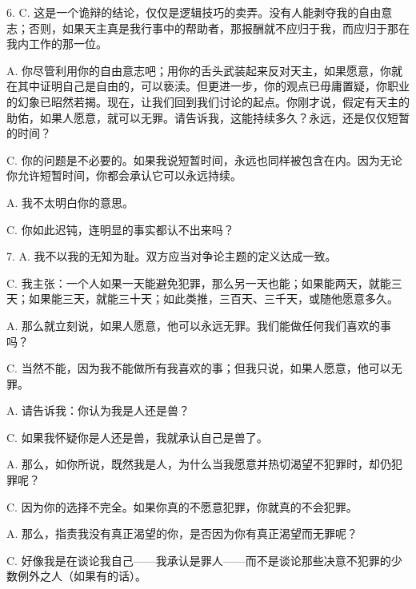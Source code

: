 6. C. 这是一个诡辩的结论，仅仅是逻辑技巧的卖弄。没有人能剥夺我的自由意志；否则，如果天主真是我行事中的帮助者，那报酬就不应归于我，而应归于那在我内工作的那一位。\par

A. 你尽管利用你的自由意志吧；用你的舌头武装起来反对天主，如果愿意，你就在其中证明自己是自由的，可以亵渎。但更进一步，你的观点已毋庸置疑，你职业的幻象已昭然若揭。现在，让我们回到我们讨论的起点。你刚才说，假定有天主的助佑，如果人愿意，就可以无罪。请告诉我，这能持续多久？永远，还是仅仅短暂的时间？\par

C. 你的问题是不必要的。如果我说短暂时间，永远也同样被包含在内。因为无论你允许短暂时间，你都会承认它可以永远持续。\par

A. 我不太明白你的意思。\par

C. 你如此迟钝，连明显的事实都认不出来吗？\par

7. A. 我不以我的无知为耻。双方应当对争论主题的定义达成一致。\par

C. 我主张：一个人如果一天能避免犯罪，那么另一天也能；如果能两天，就能三天；如果能三天，就能三十天；如此类推，三百天、三千天，或随他愿意多久。\par

A. 那么就立刻说，如果人愿意，他可以永远无罪。我们能做任何我们喜欢的事吗？\par

C. 当然不能，因为我不能做所有我喜欢的事；但我只说，如果人愿意，他可以无罪。\par

A. 请告诉我：你认为我是人还是兽？\par

C. 如果我怀疑你是人还是兽，我就承认自己是兽了。\par

A. 那么，如你所说，既然我是人，为什么当我愿意并热切渴望不犯罪时，却仍犯罪呢？\par

C. 因为你的选择不完全。如果你真的不愿意犯罪，你就真的不会犯罪。\par

A. 那么，指责我没有真正渴望的你，是否因为你有真正渴望而无罪呢？\par

C. 好像我是在谈论我自己——我承认是罪人——而不是谈论那些决意不犯罪的少数例外之人（如果有的话）。\par

